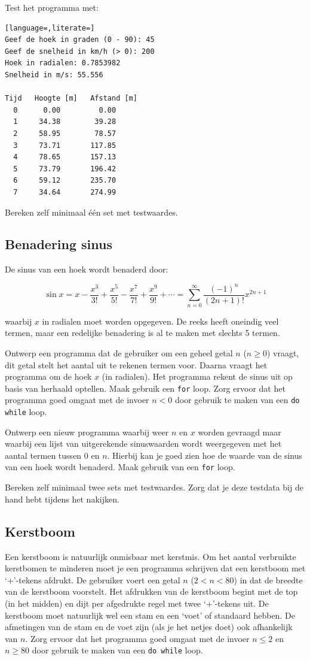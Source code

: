 \documentclass[a4paper,10pt,fleqn,twoside]{article}
\begin{document}
Test het programma met:

\begin{lstlisting}[language=,literate=]
Geef de hoek in graden (0 - 90): 45
Geef de snelheid in km/h (> 0): 200
Hoek in radialen: 0.7853982
Snelheid in m/s: 55.556

Tijd   Hoogte [m]   Afstand [m]
  0      0.00         0.00
  1     34.38        39.28
  2     58.95        78.57
  3     73.71       117.85
  4     78.65       157.13
  5     73.79       196.42
  6     59.12       235.70
  7     34.64       274.99
\end{lstlisting}

Bereken zelf minimaal één set met testwaardes.

\subsection{Benadering sinus}
De sinus van een hoek wordt benaderd door:

\begin{equation*}
\sin x = x - \dfrac{x^3}{3!} + \dfrac{x^5}{5!} - \dfrac{x^7}{7!} + \dfrac{x^9}{9!} + \cdots = \sum_{n=0}^\infty \dfrac{(-1)^n}{(2n+1)!} x^{2n+1}
\end{equation*}

waarbij $x$ in radialen moet worden opgegeven. De reeks heeft oneindig veel termen, maar een redelijke benadering is al te maken met slechts 5 termen.

Ontwerp een programma dat de gebruiker om een geheel getal $n$ ($n \geq 0$) vraagt, dit getal stelt het aantal uit te rekenen termen voor. Daarna vraagt het programma om de hoek $x$ (in radialen). Het programma rekent de sinus uit op basis van herhaald optellen. Maak gebruik een \lstinline|for| loop. Zorg ervoor dat het programma goed omgaat met de invoer $n < 0$ door gebruik te maken van een \lstinline|do while| loop.

Ontwerp een nieuw programma waarbij weer $n$ en $x$ worden gevraagd maar waarbij een lijst van uitgerekende sinuswaarden wordt weergegeven met het aantal termen tussen $0$ en $n$. Hierbij kan je goed zien hoe de waarde van de sinus van een hoek wordt benaderd. Maak gebruik van een \lstinline|for| loop.

Bereken zelf minimaal twee sets met testwaardes. Zorg dat je deze testdata bij de hand hebt tijdens het nakijken.

\subsection{Kerstboom}
Een kerstboom is natuurlijk onmisbaar met kerstmis. Om het aantal verbruikte kerstbomen te minderen moet je een programma schrijven dat een kerstboom met `+’-tekens afdrukt. De gebruiker voert een getal $n$ ($2 < n < 80$) in dat de breedte van de kerstboom voorstelt. Het afdrukken van de kerstboom begint met de top (in het midden) en dijt per afgedrukte regel met twee `+’-tekens uit. De kerstboom moet natuurlijk wel een stam en een ‘voet’ of standaard hebben. De afmetingen van de stam en de voet zijn (als je het netjes doet) ook afhankelijk van $n$. Zorg ervoor dat het programma goed omgaat met de invoer $n \leq 2$ en $n \geq 80$ door gebruik te maken van een \lstinline|do while| loop.
\end{document}
